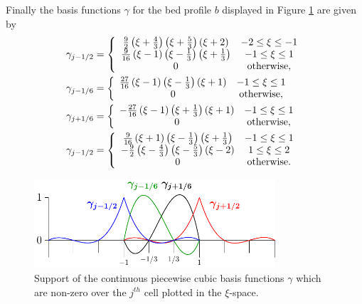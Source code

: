Finally the basis functions $\gamma$ for the bed profile $b$ displayed in Figure \ref{fig:P3ContBasisAPP} are given by
\begin{subequations}
	\label{eqn:App1:GamDef}
\begin{align}
\gamma_{j-1/2} &= \left\lbrace \begin{array}{c c}
\frac{9}{2}\left(\xi + \frac{4}{3}\right)\left(\xi + \frac{5}{3}\right)\left(\xi + 2\right) & -2 \le \xi \le -1\\
\frac{9}{16}\left(\xi - 1\right)\left(\xi - \frac{1}{3}\right)\left(\xi  + \frac{1}{3}\right) & -1 \le \xi \le 1\\
0 & \text{otherwise}, 
\end{array} \right. \\
\gamma_{j-1/6} &= \left\lbrace \begin{array}{c c}
\frac{27}{16}\left(\xi - 1\right)\left(\xi - \frac{1}{3}\right)\left(\xi + 1\right) & -1 \le \xi \le 1\\
0 & \text{otherwise}, 
\end{array} \right. \\
\gamma_{j+1/6} &= \left\lbrace \begin{array}{c c}
-\frac{27}{16}\left(\xi - 1\right)\left(\xi + \frac{1}{3}\right)\left(\xi + 1\right) & -1 \le \xi \le 1\\
0 & \text{otherwise} ,
\end{array} \right. \\
\gamma_{j-1/2} &= \left\lbrace \begin{array}{c c}
\frac{9}{16}\left(\xi + 1\right)\left(\xi - \frac{1}{3}\right)\left(\xi  + \frac{1}{3}\right) & -1 \le \xi \le 1\\
-\frac{9}{2}\left(\xi - \frac{4}{3}\right)\left(\xi - \frac{5}{3}\right)\left(\xi - 2\right) & 1 \le \xi \le 2\\
0 & \text{otherwise} .
\end{array} \right. 
\end{align}
\end{subequations}

\begin{figure}
	\centering
	\includegraphics[width=0.8\textwidth]{./app1/Figures/P3.pdf}
	\caption{Support of the continuous piecewise cubic basis functions $\gamma$ which are non-zero over the $j^{th}$ cell plotted in the $\xi$-space.}
	\label{fig:P3ContBasisAPP}
\end{figure}

